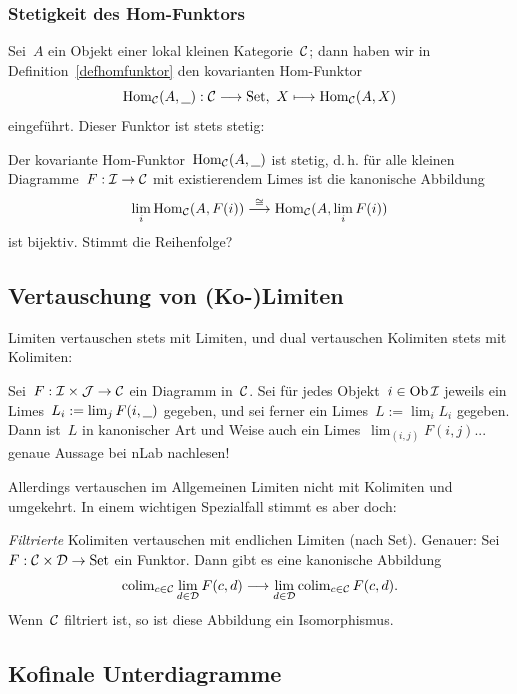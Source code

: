 \subsubsection{Stetigkeit des Hom-Funktors}

Sei~$A$ ein Objekt einer lokal kleinen Kategorie~$\mathcal{C}$; dann haben wir in
Definition~\ref{defhomfunktor} den kovarianten Hom-Funktor
\[ \mathrm{Hom}_{\mathcal{C}}(A, \underline{\ \ }) : \mathcal{C} \longrightarrow \mathrm{Set},\ X \longmapsto \mathrm{Hom}_{\mathcal{C}}(A,X) \]
eingeführt. Dieser Funktor ist stets stetig:
\begin{prop}Der kovariante Hom-Funktor~$\mathrm{Hom}_{\mathcal{C}}(A,\underline{\ \ })$ ist stetig, d.\,h.
für alle kleinen Diagramme~$F : \mathcal{I} \to \mathcal{C}$ mit existierendem Limes ist die
kanonische Abbildung
\[ \lim_i \mathrm{Hom}_{\mathcal{C}}(A, F(i)) \stackrel{\cong}{\longrightarrow} \mathrm{Hom}_{\mathcal{C}}(A, \lim_i F(i)) \]
ist bijektiv. Stimmt die Reihenfolge?
\end{prop}


\subsection{Vertauschung von (Ko-)Limiten}

Limiten vertauschen stets mit Limiten, und dual vertauschen Kolimiten stets mit Kolimiten:
\begin{prop}
Sei~$F : \mathcal{I} \times \mathcal{J} \to \mathcal{C}$ ein Diagramm in~$\mathcal{C}$. Sei für jedes Objekt~$i \in
\operatorname{Ob}\mathcal{I}$ jeweils ein Limes~$L_i := \lim_j F(i, \underline{\ \ })$ gegeben, und sei ferner
ein Limes~$L := \lim_i L_i$ gegeben. Dann ist~$L$ in kanonischer Art und Weise
auch ein Limes~$\lim_{(i,j)} F(i,j)$... genaue Aussage bei nLab nachlesen!
\end{prop}

Allerdings vertauschen im Allgemeinen Limiten nicht mit Kolimiten und
umgekehrt. In einem wichtigen Spezialfall stimmt es aber doch:
\begin{prop}\emph{Filtrierte} Kolimiten vertauschen mit endlichen Limiten (nach
Set). Genauer: Sei~$F : \mathcal{C} \times \mathcal{D} \to \mathrm{Set}$ ein Funktor. Dann gibt es eine
kanonische Abbildung
\[ \operatorname{colim}\limits_{c \in \mathcal{C}}\lim\limits_{d \in \mathcal{D}} F(c,d) \longrightarrow
  \lim\limits_{d \in \mathcal{D}} \operatorname{colim}\limits_{c \in \mathcal{C}} F(c,d). \]
Wenn~$\mathcal{C}$ filtriert ist, so ist diese Abbildung ein Isomorphismus.
\end{prop}


\subsection{Kofinale Unterdiagramme}

